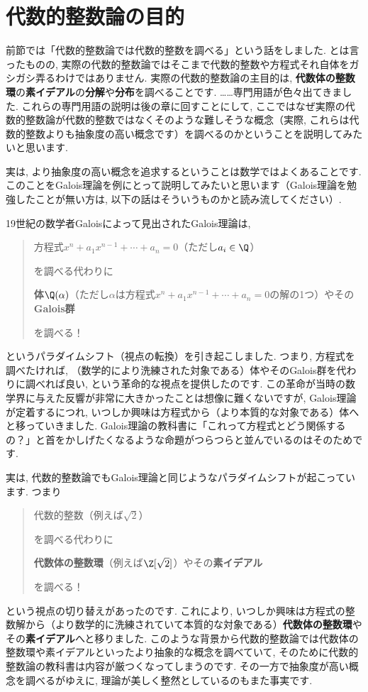 \documentclass[11pt,b5paper,oneside,titlepage,lualatex]{ltjsreport}
\numberwithin{equation}{section} %
\begin{document}
\section{代数的整数論の目的} \label{sec:代数的整数論の目的}


前節では「代数的整数論では代数的整数を調べる」という話をしました. 
とは言ったものの, 実際の代数的整数論ではそこまで代数的整数や方程式それ自体をガシガシ弄るわけではありません. 
実際の代数的整数論の主目的は, \textbf{代数体の整数環}の\textbf{素イデアル}の\textbf{分解}や\textbf{分布}を調べることです. 
……専門用語が色々出てきました. 
これらの専門用語の説明は後の章に回すことにして, ここではなぜ実際の代数的整数論が代数的整数ではなくそのような難しそうな概念（実際, これらは代数的整数よりも抽象度の高い概念です）を調べるのかということを説明してみたいと思います. 

実は, より抽象度の高い概念を追求するということは数学ではよくあることです. 
このことをGalois理論を例にとって説明してみたいと思います（Galois理論を勉強したことが無い方は, 以下の話はそういうものかと読み流してください）. 

19世紀の数学者Galoisによって見出されたGalois理論は, 
\begin{quote}
	\centering
	方程式$ x^n + a_1 x^{n-1} + \cdots + a_n = 0 $（ただし$ a_i \in \Q $）
	
	を調べる代わりに
	
	\textbf{体}$ \Q(\alpha) $（ただし$ \alpha $は方程式$ x^n + a_1 x^{n-1} + \cdots + a_n = 0 $の解の1つ）やその\textbf{Galois群}
	
	を調べる！
\end{quote}
というパラダイムシフト（視点の転換）を引き起こしました. 
つまり, 方程式を調べたければ, （数学的により洗練された対象である）体やそのGalois群を代わりに調べれば良い, という革命的な視点を提供したのです. 
この革命が当時の数学界に与えた反響が非常に大きかったことは想像に難くないですが, Galois理論が定着するにつれ, いつしか興味は方程式から（より本質的な対象である）体へと移っていきました. 
Galois理論の教科書に「これって方程式とどう関係するの？」と首をかしげたくなるような命題がつらつらと並んでいるのはそのためです. 

実は, 代数的整数論でもGalois理論と同じようなパラダイムシフトが起こっています. つまり
\begin{quote}
	\centering
	代数的整数（例えば$ \sqrt{2} $）
	
	を調べる代わりに
	
	\textbf{代数体の整数環}（例えば$ \Z[\sqrt{2}] $）やその\textbf{素イデアル}
	
	を調べる！
\end{quote}
という視点の切り替えがあったのです. 
これにより, いつしか興味は方程式の整数解から（より数学的に洗練されていて本質的な対象である）\textbf{代数体の整数環}やその\textbf{素イデアル}へと移りました. 
このような背景から代数的整数論では代数体の整数環や素イデアルといったより抽象的な概念を調べていて, そのために代数的整数論の教科書は内容が厳つくなってしまうのです. 
その一方で抽象度が高い概念を調べるがゆえに, 理論が美しく整然としているのもまた事実です. 
\end{document}
